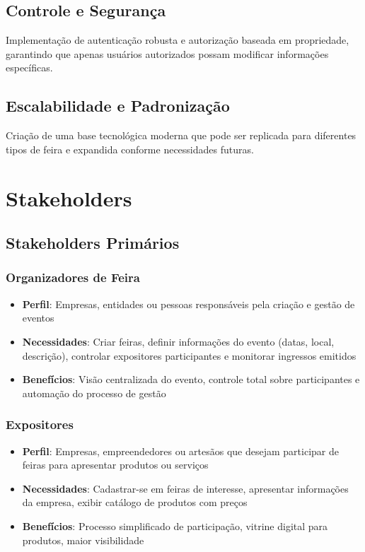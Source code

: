 \documentclass[12pt,a4paper]{article}
\begin{document}
\subsection{Controle e Segurança}
Implementação de autenticação robusta e autorização baseada em propriedade, garantindo que apenas usuários autorizados possam modificar informações específicas.

\subsection{Escalabilidade e Padronização}
Criação de uma base tecnológica moderna que pode ser replicada para diferentes tipos de feira e expandida conforme necessidades futuras.

\section{Stakeholders}

\subsection{Stakeholders Primários}

\subsubsection{Organizadores de Feira}
\begin{itemize}
    \item \textbf{Perfil}: Empresas, entidades ou pessoas responsáveis pela criação e gestão de eventos
    \item \textbf{Necessidades}: Criar feiras, definir informações do evento (datas, local, descrição), controlar expositores participantes e monitorar ingressos emitidos
    \item \textbf{Benefícios}: Visão centralizada do evento, controle total sobre participantes e automação do processo de gestão
\end{itemize}

\subsubsection{Expositores}
\begin{itemize}
    \item \textbf{Perfil}: Empresas, empreendedores ou artesãos que desejam participar de feiras para apresentar produtos ou serviços
    \item \textbf{Necessidades}: Cadastrar-se em feiras de interesse, apresentar informações da empresa, exibir catálogo de produtos com preços
    \item \textbf{Benefícios}: Processo simplificado de participação, vitrine digital para produtos, maior visibilidade
\end{itemize}
\end{document}
